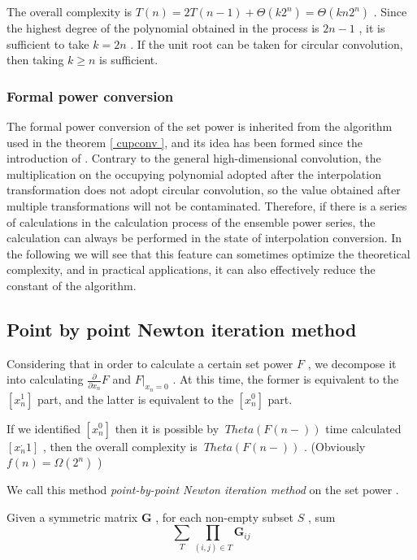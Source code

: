 {The overall complexity is $ T(n)= 2 T(n- 1 )+ \Theta (k 2 ^n)= \Theta (kn 2 ^n) $ . Since the highest degree of the polynomial obtained in the process is $ 2 n- 1 $ , it is sufficient to take $ k = 2 n $ . If the unit root can be taken for circular convolution, then taking $ k \ge n $ is sufficient.

\subsubsection { Formal power conversion }

The formal power conversion of the set power is inherited from the algorithm used in the theorem \ref { cupconv }, and its idea has been formed since the introduction of \cite { vfk }. Contrary to the general high-dimensional convolution, the multiplication on the occupying polynomial adopted after the interpolation transformation does not adopt circular convolution, so the value obtained after multiple transformations will not be contaminated. Therefore, if there is a series of calculations in the calculation process of the ensemble power series, the calculation can always be performed in the state of interpolation conversion. In the following we will see that this feature can sometimes optimize the theoretical complexity, and in practical applications, it can also effectively reduce the constant of the algorithm.

\subsection { Point by point Newton iteration method }

Considering that in order to calculate a certain set power $ F $ , we decompose it into calculating $ \frac { \partial }{ \partial x_n} F $ and $ \left . F \right |_{x_n=0} $ . At this time, the former is equivalent to the $ [x_n^ 1 ] $ part, and the latter is equivalent to the $ [x_n^ 0 ] $ part.

If we identified $ [x_n ^ 0 ] $ then it is possible by $ \ Theta (F (n-)) $ time calculated $ [x_n ^ . 1 ] $ , then the overall complexity is $ \ Theta (F (n-) ) $ . (Obviously $ f(n) = \Omega ( 2 ^n) $ )

We call this method \emph { point-by-point Newton iteration method } on the set power .

\begin { problem }
Given a symmetric matrix $ \mathbf G $ , for each non-empty subset $ S $ , sum
$$
\sum _T \prod _{(i, j) \in T} \mathbf G_{ij}
$$


\end{ problem }}
